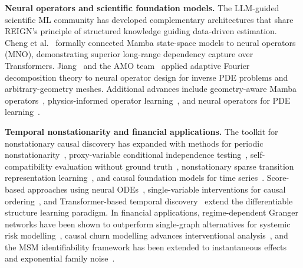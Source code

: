 \noindent\textbf{Neural operators and scientific foundation models.}
The LLM-guided scientific ML community has developed
complementary architectures that share REIGN's principle of
structured knowledge guiding data-driven estimation.
Cheng et al.\ \cite{Cheng2026MNO} formally connected Mamba
state-space models to neural operators (MNO), demonstrating
superior long-range dependency capture over Transformers.
Jiang~\cite{Jiang2026AFDONet} and the AMO team~\cite{AMO2026ICLR}
applied adaptive Fourier decomposition theory to neural operator
design for inverse PDE problems and arbitrary-geometry meshes.
Additional advances include geometry-aware Mamba
operators~\cite{Gu2024Mamba}, physics-informed operator
learning~\cite{Zanardi2023PhysicsInformed}, and neural operators
for PDE learning~\cite{Kovachki2023}.

\noindent\textbf{Temporal nonstationarity and financial applications.}
The toolkit for nonstationary causal discovery has expanded with
methods for periodic nonstationarity~\cite{Gao2024PCMCI},
proxy-variable conditional independence testing~\cite{Miao2024Proxy},
self-compatibility evaluation without ground truth~\cite{Mogensen2024Compat},
nonstationary sparse transition representation learning~\cite{Chen2024CtrlNS},
and causal foundation models for time series~\cite{Wen2023Foundation}.
Score-based approaches using neural ODEs~\cite{Bellot2022NeurODE},
single-variable interventions for causal ordering~\cite{Chevalley2024CD},
and Transformer-based temporal discovery~\cite{Chen2023Transformer}
extend the differentiable structure learning paradigm.
In financial applications, regime-dependent Granger networks
have been shown to outperform single-graph alternatives for
systemic risk modelling~\cite{Billio2024Spillover}, causal churn
modelling advances interventional
analysis~\cite{Ouyang2024Churn}, and the MSM identifiability
framework has been extended to instantaneous effects and
exponential family noise~\cite{Dong2023MSM}.